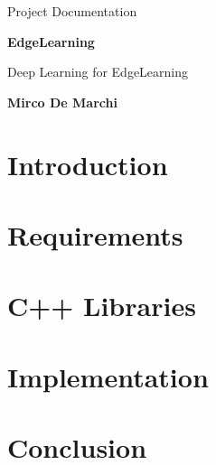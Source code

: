 \documentclass[12pt, a4paper,titlepage]{report}
\begin{document}
	\begin{titlepage}
		\begin{center}
			\vspace*{2cm}
			
			\normalsize
			Project Documentation
			
			\vspace{2.5cm}
			
			\Huge
			\textbf{EdgeLearning}
			\vspace{0.5cm}
			
			\large
			Deep Learning for EdgeLearning
			
			\vspace{3cm}
			
			\large
			\textbf{Mirco De Marchi}
			
			\vspace{5cm}
		\end{center}
	\end{titlepage}
	
	\tableofcontents
	
	\chapter{Introduction}
	
	
	\chapter{Requirements}
	
	
	\chapter{C++ Libraries}
	
	
	\chapter{Implementation}
	
	
	\chapter{Conclusion}
	
	
\end{document}
